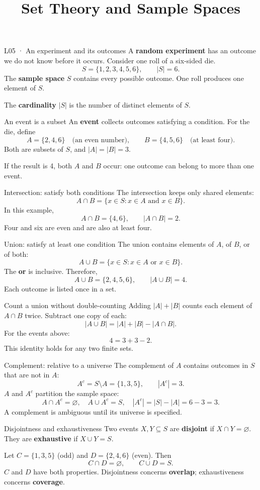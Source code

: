 \documentclass[aspectratio=169,11pt,english]{beamer}
\title[L05 · Foundations]{Set Theory and Sample Spaces}
\begin{document}
\begin{frame}{L05 · An experiment and its outcomes}
A \textbf{random experiment} has an outcome we do not know before it occurs.
Consider one roll of a six-sided die.
\[
S=\{1,2,3,4,5,6\},\qquad |S|=6.
\]
The \textbf{sample space} $S$ contains every possible outcome. One roll produces one element of $S$.

\medskip
The \textbf{cardinality} $|S|$ is the number of distinct elements of $S$.
\end{frame}
\begin{frame}{An event is a subset}
An \textbf{event} collects outcomes satisfying a condition. For the die, define
\[
A=\{2,4,6\}\quad\text{(an even number)},\qquad
B=\{4,5,6\}\quad\text{(at least four)}.
\]
Both are subsets of $S$, and $|A|=|B|=3$.

\medskip
If the result is 4, both $A$ and $B$ occur: one outcome can belong to more than one event.
\end{frame}
\begin{frame}{Intersection: satisfy both conditions}
The intersection keeps only shared elements:
\[
A\cap B=\{x\in S:x\in A\text{ and }x\in B\}.
\]
In this example,
\[
A\cap B=\{4,6\},\qquad |A\cap B|=2.
\]
Four and six are even and are also at least four.
\end{frame}
\begin{frame}{Union: satisfy at least one condition}
The union contains elements of $A$, of $B$, or of both:
\[
A\cup B=\{x\in S:x\in A\text{ or }x\in B\}.
\]
The \textbf{or} is inclusive. Therefore,
\[
A\cup B=\{2,4,5,6\},\qquad |A\cup B|=4.
\]
Each outcome is listed once in a set.
\end{frame}
\begin{frame}{Count a union without double-counting}
Adding $|A|+|B|$ counts each element of $A\cap B$ twice. Subtract one copy of each:
\[
|A\cup B|=|A|+|B|-|A\cap B|.
\]
For the events above:
\[
4=3+3-2.
\]
This identity holds for any two finite sets.
\end{frame}
\begin{frame}{Complement: relative to a universe}
The complement of $A$ contains outcomes in $S$ that are not in $A$:
\[
A^c=S\setminus A=\{1,3,5\},\qquad |A^c|=3.
\]
$A$ and $A^c$ partition the sample space:
\[
A\cap A^c=\varnothing,\quad A\cup A^c=S,\quad
|A^c|=|S|-|A|=6-3=3.
\]
A complement is ambiguous until its universe is specified.
\end{frame}
\begin{frame}{Disjointness and exhaustiveness}
Two events $X,Y\subseteq S$ are \textbf{disjoint} if $X\cap Y=\varnothing$.
They are \textbf{exhaustive} if $X\cup Y=S$.

\medskip
Let $C=\{1,3,5\}$ (odd) and $D=\{2,4,6\}$ (even). Then
\[
C\cap D=\varnothing,\qquad C\cup D=S.
\]
$C$ and $D$ have both properties. Disjointness concerns \textbf{overlap}; exhaustiveness concerns \textbf{coverage}.
\end{frame}
\end{document}
